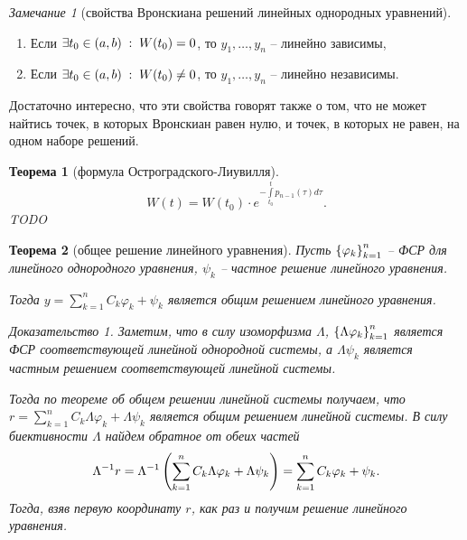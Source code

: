 \documentclass[a5paper, 10pt]{article}
\theoremstyle{definition}
\theoremstyle{plain}
\newtheorem{Th}{Теорема}
\theoremstyle{remark}
\newtheorem*{Note}{Замечание}
\newtheorem*{Proof}{Доказательство}
\begin{document}
	\begin{Note}[свойства Вронскиана решений линейных однородных уравнений]
		\begin{enumerate}
			Пусть $y_1, \dots, y_n$ -- решения линейного однородного уравнения.
			
			Тогда 
			\item Если $
			\exists t_0 \in \left(a,b\right) \;:\; W(t_0) = 0
			$, то $y_1, \dots, y_n$ -- линейно зависимы,
			\item Если $
			\exists t_0 \in \left(a,b\right) \;:\; W(t_0) \neq 0
			$, то $y_1, \dots, y_n$ -- линейно независимы.
		\end{enumerate}
	
	Достаточно интересно, что эти свойства говорят также о том, что не может найтись точек, в которых Вронскиан равен нулю, и точек, в которых не равен, на одном наборе решений.
	\end{Note}

	\begin{Th}[формула Остроградского-Лиувилля]
		\[
		W(t) = W(t_0) \cdot e^{-\int\limits_{t_0}^t p_{n-1}(\tau) d\tau}.
		\]
		TODO
	\end{Th}
	
	\begin{Th}[общее решение линейного уравнения]
		Пусть $\left\{\varphi_k\right\}_{k=1}^n$ -- ФСР для линейного однородного уравнения, $\psi_k$ -- частное решение линейного уравнения. 
		
		Тогда $y = \sum\limits_{k=1}^n C_k \varphi_k + \psi_k$ является общим решением линейного уравнения.
		\begin{Proof}
			Заметим, что в силу изоморфизма $\Lambda$, $\left\{\Lambda \varphi_k\right\}_{k=1}^n$ является ФСР соответствующей линейной однородной системы, а $\Lambda \psi_k$ является частным решением соответствующей линейной системы.
			
			Тогда по теореме об общем решении линейной системы получаем, что $r=\sum\limits_{k=1}^n C_k \Lambda \varphi_k + \Lambda \psi_k$ является общим решением линейной системы. 
			В силу биективности $\Lambda$ найдем обратное от обеих частей
			\[
			\Lambda^{-1} r = \Lambda^{-1} \left(\sum\limits_{k=1}^n C_k \Lambda \varphi_k + \Lambda \psi_k\right) = \sum\limits_{k=1}^n C_k \varphi_k + \psi_k.
			\]
			Тогда, взяв первую координату $r$, как раз и получим решение линейного уравнения.
		\end{Proof}
	\end{Th}
\end{document}
